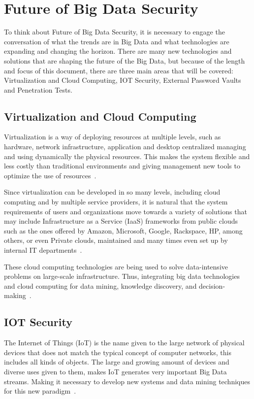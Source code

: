 \section{Future of Big Data Security}
To think about Future of Big Data Security, it is necessary to 
engage the conversation of what the trends are in Big Data
and what technologies are expanding and changing the horizon.
There are many new technologies and solutions that are shaping 
the future of the Big Data, but because of the length and focus
of this document, there are three main areas that will be
covered: Virtualization and Cloud Computing, IOT Security,
External Password Vaults and Penetration Tests.

\subsection{Virtualization and Cloud Computing}

Virtualization is a way of deploying resources at multiple levels, 
such as hardware, network infrastructure, application and desktop 
centralized managing and using dynamically the physical resources.
This makes the system flexible and less costly than traditional 
environments and giving management new tools to optimize the
use of resources~\cite{padmini2015securing}.

Since virtualization can be developed in so many levels, including
cloud computing and by multiple service providers, it is 
natural that the system requirements of users and organizations
move towards a variety of solutions that may include 
Infrastructure as a Service (IaaS) frameworks from public 
clouds such as the ones offered by Amazon, Microsoft, Google,
Rackspace, HP, among others, or even Private clouds,
maintained and many times even set up by internal IT
departments~\cite{von2014accessing}.

These cloud computing technologies are being used to solve
data-intensive problems on large-scale infrastructure. Thus,
integrating big data technologies and cloud computing for data
mining, knowledge discovery, and decision-making~\cite{kune2016anatomy}.

\subsection{IOT Security}

The Internet of Things (IoT) is the name given to the large network
of physical devices that does not match the typical concept of 
computer networks, this includes all kinds of objects. The large
and growing amount of devices and diverse uses given to them, 
makes IoT generates very important Big Data streams. Making it 
necessary to develop new systems and data mining techniques
for this new paradigm~\cite{bifet2016mining}.

